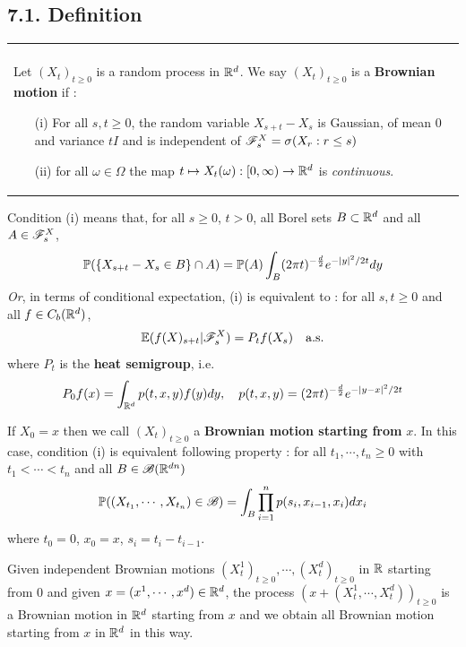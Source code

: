 \documentclass[12pt,a4paper]{report}
\begin{document}
\subsection*{7.1. Definition}

\begin{tabular}{|p{}|}
\hline \\
Let $(X_t)_{t\geq 0}$ is a random process in $\mathbb{R}^d$. We say $(X_t)_{t\geq 0}$ is a \textbf{Brownian motion} if :
\begin{itemize}
\item[(i)] For all $s,t\geq 0$, the random variable $X_{s+t}-X_s$ is Gaussian, of mean 0 and variance $tI$ and is independent of $\mathscr{F}_s^X = \sigma(X_r : r\leq s)$
\item[(ii)] for all $\omega \in \Omega$ the map $t\mapsto X_{t} (\omega) : [0,\infty ) \rightarrow \mathbb{R}^d$ is \emph{continuous}.
\end{itemize}
\\ \hline
\end{tabular}
\s

Condition (i) means that, for all $s\geq 0$, $t>0$, all Borel sets $B\subset \mathbb{R}^d$ and all $A \in \mathscr{F}_s^X$,
\begin{align*}
\mathbb{P}( \{ X_{s+t} - X_s \in B \} \cap A ) = \mathbb{P}(A) \int_B (2\pi t)^{-\frac{d}{2}} e^{-|y|^2/2t} dy
\end{align*}
\emph{Or}, in terms of conditional expectation, (i) is equivalent to : for all $s,t \geq 0$ and all $f\in C_b (\mathbb{R}^d)$,
\begin{align*}
\mathbb{E} (f(X)_{s+t} | \mathscr{F}^X_s) = P_t f(X_s) \quad \text{a.s.} 
\end{align*}
where $P_t$ is the \textbf{heat semigroup}, i.e. 
\begin{align*}
P_0 f(x) = \int_{\mathbb{R}^d} p(t,x,y)f(y)dy, \quad p(t,x,y) = (2\pi t)^{-\frac{d}{2}}  e^{-|y-x|^2/2t}
\end{align*}
\s

If $X_0 =x$ then we call $(X_t)_{t\geq 0}$ a \textbf{Brownian motion starting from} $x$. In this case, condition (i) is equivalent following property : for all $t_1, \cdots, t_n \geq 0$ with $t_1 < \cdots < t_n$ and all $B \in \mathscr{B}(\mathbb{R}^{dn})$
\begin{align*}
\mathbb{P}( (X_{t_1},\cdots, X_{t_n}) \in \mathscr{B}  ) = \int_B \prod_{i=1}^n p(s_i, x_{i-1},x_i) dx_i
\end{align*}
where $t_0 =0$, $x_0=x$, $s_i = t_i-t_{i-1}$.
\s

Given independent Brownian motions $(X^1_t)_{t\geq 0},\cdots, (X_t^d)_{t\geq 0}$ in $\mathbb{R}$ starting from $0$ and given $x=(x^1, \cdots, x^d) \in \mathbb{R}^d$, the process $(x + (X_t^1, \cdots, X_t^d))_{t\geq 0}$ is a Brownian motion in $\mathbb{R}^d$ starting from $x$ and we obtain all Brownian motion starting from $x$ in $\mathbb{R}^d$ in this way.
\s
\end{document}
